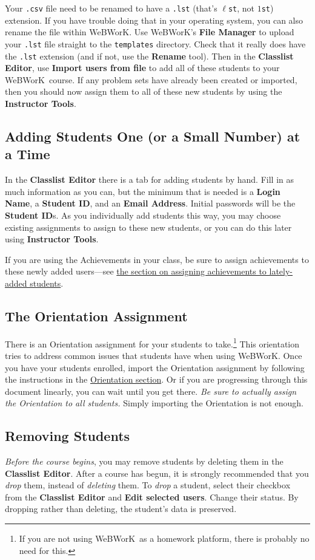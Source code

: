 \documentclass[12pt]{article}
\newcommand{\menu}[1]{\textbf{#1}}
\newcommand{\WW}{WeBWorK}
\begin{document}
Your \texttt{.csv} file need to be renamed to have a \texttt{.lst} (that's $\ell$\texttt{st}, not
$1$\texttt{st}) extension. If you have trouble doing that in your operating system, you can also rename the file within \WW. Use \WW's \menu{File Manager} to upload your \texttt{.lst} file straight to the \texttt{templates} directory. Check that it really does have the \texttt{.lst} extension (and if not, use the \menu{Rename} tool). Then in the \menu{Classlist Editor}, use \menu{Import users from file} to add all of these students to your \WW\ course. If any problem sets have already been created or imported, then you should now assign them to all of these new students by using the \menu{Instructor Tools}.


\subsection{Adding Students One (or a Small Number) at a Time}
In the \menu{Classlist Editor} there is a tab for adding students by hand.  Fill in as much information as you can, but the minimum that is needed is a \menu{Login Name}, a \menu{Student ID}, and an \menu{Email Address}. Initial passwords will be the \menu{Student ID}s.  As you individually add students this way, you may choose existing assignments to assign to these new students, or you can do this later using \menu{Instructor Tools}.

If you are using the Achievements in your class, be sure to assign achievements to these newly added users---see \hyperref[achievementslateaddstudents]{the section on assigning achievements to lately-added students}.

\subsection{The Orientation Assignment}
There is an Orientation assignment for your students to take.\footnote{If you are not using \WW\ as a homework platform, there is probably no need for this.} This orientation tries to address common issues that students have when using \WW. Once you have your students enrolled, import the Orientation assignment by following the instructions in the \hyperref[orientation]{Orientation section}. Or if you are progressing through this document linearly, you can wait until you get there. \emph{Be sure to actually assign the Orientation to all students.} Simply importing the Orientation is not enough.

\subsection{Removing Students}
\emph{Before the course begins}, you may remove students by deleting them in the \menu{Classlist Editor}. After a course has begun, it is strongly recommended that you \emph{drop} them, instead of \emph{deleting} them.  To \emph{drop} a student, select their checkbox from the \menu{Classlist Editor} and \menu{Edit selected users}.  Change their status.  By dropping rather than deleting, the student's data is preserved.
\end{document}
